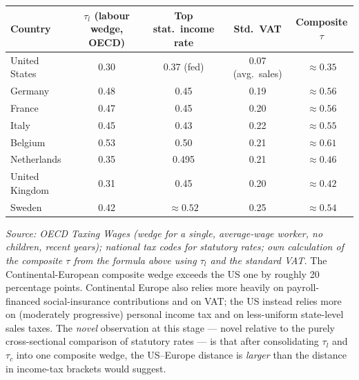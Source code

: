 \documentclass[11pt,a4paper]{article}
\begin{document}
\begin{center}
\small
\begin{tabular}{lcccc}
\toprule
Country & $\tau_l$ (labour wedge, OECD) & Top stat.\ income rate & Std.\ VAT & Composite $\tau$ \\
\midrule
United States   & 0.30 & 0.37 (fed)      & 0.07 (avg.\ sales) & $\approx 0.35$ \\
Germany         & 0.48 & 0.45            & 0.19               & $\approx 0.56$ \\
France          & 0.47 & 0.45            & 0.20               & $\approx 0.56$ \\
Italy           & 0.45 & 0.43            & 0.22               & $\approx 0.55$ \\
Belgium         & 0.53 & 0.50            & 0.21               & $\approx 0.61$ \\
Netherlands     & 0.35 & 0.495           & 0.21               & $\approx 0.46$ \\
United Kingdom  & 0.31 & 0.45            & 0.20               & $\approx 0.42$ \\
Sweden          & 0.42 & $\approx 0.52$  & 0.25               & $\approx 0.54$ \\
\bottomrule
\end{tabular}
\end{center}
\emph{Source: OECD \emph{Taxing Wages} (wedge for a single, average-wage worker, no children, recent years); national tax codes for statutory rates; own calculation of the composite $\tau$ from the formula above using $\tau_l$ and the standard VAT.} The Continental-European composite wedge exceeds the US one by roughly 20 percentage points. Continental Europe also relies more heavily on payroll-financed social-insurance contributions and on VAT; the US instead relies more on (moderately progressive) personal income tax and on less-uniform state-level sales taxes. The \emph{novel} observation at this stage --- novel relative to the purely cross-sectional comparison of statutory rates --- is that after consolidating $\tau_l$ and $\tau_c$ into one composite wedge, the US--Europe distance is \emph{larger} than the distance in income-tax brackets would suggest.
\end{document}
